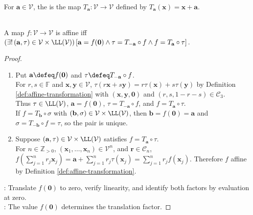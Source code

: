 \begin{definition} \label{def:translation-map} \\
For $\mathbf{a}\in\mathcal{V}$, the  is the map $T_{\mathbf{a}}:\mathcal{V}\to\mathcal{V}$ defined by $T_{\mathbf{a}}(\mathbf{x})=\mathbf{x}+\mathbf{a}$.
\end{definition}

\begin{theorem} \label{thm:affine-map-linear-part-translation} \\
A map $f:\mathcal{V}\to\mathcal{V}$ is affine iff $(\exists!\,(\mathbf{a},\tau)\in\mathcal{V}\times\LL(\mathcal{V}))\,[\mathbf{a}=f(\mathbf{0})\land\tau=T_{-\mathbf{a}}\circ f\land f=T_{\mathbf{a}}\circ\tau]$.
\begin{proof}
\begin{enumerate}[label=\roman*.]
\setlength{\itemsep}{0pt}
\item[$(\Rightarrow)$] Put $\mathbf{a}\defeq f(\mathbf{0})$ and $\tau\defeq T_{-\mathbf{a}}\circ f$.\\
For $r,s\in\mathbb{F}$ and $\mathbf{x},\mathbf{y}\in\mathcal{V}$, $\tau(r\mathbf{x}+s\mathbf{y})=r\tau(\mathbf{x})+s\tau(\mathbf{y})$ by Definition \ref{def:affine-transformation} with $(\mathbf{x},\mathbf{y},\mathbf{0})$ and $(r,s,1-r-s)\in\mathcal{C}_3$.\\
Thus $\tau\in\LL(\mathcal{V})$, $\mathbf{a}=f(\mathbf{0})$, $\tau=T_{-\mathbf{a}}\circ f$, and $f=T_{\mathbf{a}}\circ\tau$.\\
If $f=T_{\mathbf{b}}\circ\sigma$ with $(\mathbf{b},\sigma)\in\mathcal{V}\times\LL(\mathcal{V})$, then $\mathbf{b}=f(\mathbf{0})=\mathbf{a}$ and $\sigma=T_{-\mathbf{b}}\circ f=\tau$, so the pair is unique.
\item[$(\Leftarrow)$] Suppose $(\mathbf{a},\tau)\in\mathcal{V}\times\LL(\mathcal{V})$ satisfies $f=T_{\mathbf{a}}\circ\tau$.\\
For $n\in\mathbb{Z}_{>0}$, $(\mathbf{x}_1,\ldots,\mathbf{x}_n)\in\mathcal{V}^n$, and $\mathbf{r}\in\mathcal{C}_n$, $f(\sum\limits_{j=1}^n r_j\mathbf{x}_j)=\mathbf{a}+\sum\limits_{j=1}^n r_j\tau(\mathbf{x}_j)=\sum\limits_{j=1}^n r_jf(\mathbf{x}_j)$. Therefore $f$ affine by Definition \ref{def:affine-transformation}.
\end{enumerate}
: Translate $f(\mathbf{0})$ to zero, verify linearity, and identify both factors by evaluation at zero.\\
: The value $f(\mathbf{0})$ determines the translation factor.
\end{proof}
\end{theorem}

